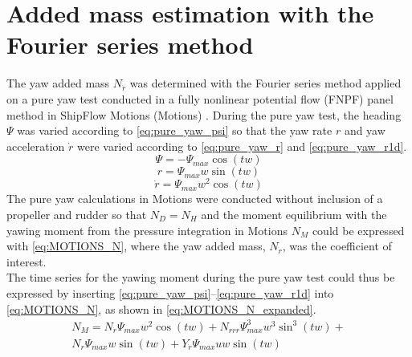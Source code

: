 \section{Added mass estimation with the Fourier series method}
\label{sec:fourier}
The yaw added mass $N_{\dot{r}}$ was determined with the Fourier series method \cite{sakamotoCFDBasedTurning2021} applied on a pure yaw test conducted in a fully nonlinear potential flow (FNPF) panel method in ShipFlow Motions (Motions) \cite{kjellbergFullyNonlinearUnsteady2013}.
During the pure yaw test, the heading $\Psi$ was varied according to \autoref{eq:pure_yaw_psi} so that the yaw rate $r$ and yaw acceleration $\dot{r}$ were varied according to \autoref{eq:pure_yaw_r} and \autoref{eq:pure_yaw_r1d}.
\begin{equation}
    \Psi = - \Psi_{max} \cos{\left(t w \right)}
    \label{eq:pure_yaw_psi}
\end{equation}
\begin{equation}
    r = \Psi_{max} w \sin{\left(t w \right)}
    \label{eq:pure_yaw_r}
\end{equation}
\begin{equation}
    \dot{r} = \Psi_{max} w^{2} \cos{\left(t w \right)}
    \label{eq:pure_yaw_r1d}
\end{equation}
The pure yaw calculations in Motions were conducted without inclusion of a propeller and rudder so that $N_D=N_H$ and the moment equilibrium with the yawing moment from the pressure integration in Motions $N_M$ could be expressed with \autoref{eq:MOTIONS_N}, where the yaw added mass, $N_{\dot{r}}$, was the coefficient of interest. 
\begin{equation}
    
    \label{eq:MOTIONS_N}
\end{equation}
The time series for the yawing moment during the pure yaw test could thus be expressed by inserting \autoref{eq:pure_yaw_psi}--\autoref{eq:pure_yaw_r1d} into \autoref{eq:MOTIONS_N}, as shown in \autoref{eq:MOTIONS_N_expanded}.
\begin{equation}
    \begin{aligned}    
    N_{M} = N_{\dot{r}} \Psi_{max} w^{2} \cos{\left(t w \right)} + N_{rrr} \Psi_{max}^{3} w^{3} \sin^{3}{\left(t w \right)} + \\ 
    N_{r} \Psi_{max} w \sin{\left(t w \right)} + Y_{\dot{r}} \Psi_{max} u w \sin{\left(t w \right)}
    \end{aligned}
    \label{eq:MOTIONS_N_expanded}
\end{equation}
